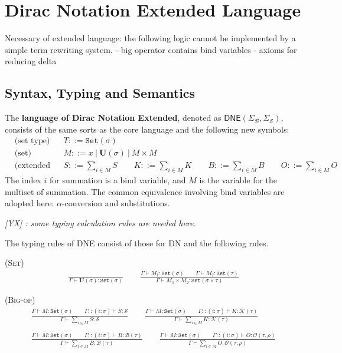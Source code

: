\documentclass[manuscript, review, timestamp]{acmart}
\newcommand{\yx}[1]{\textit{\color{blue}[YX] : #1}}
\newcommand*{\Sc}{\mathcal{S}}
\newcommand*{\K}{\mathcal{K}}
\newcommand*{\B}{\mathcal{B}}
\newcommand*{\Op}{\mathcal{O}}
\begin{document}

\section{Dirac Notation Extended Language}

Necessary of extended language: the following logic cannot be implemented by a simple term rewriting system.
- big operator contains bind variables
- axioms for reducing delta

\subsection{Syntax, Typing and Semantics}
\begin{definition}[DNE]
    The \textbf{language of Dirac Notation Extended}, denoted as $\textsf{DNE}(\Sigma_\mathcal{B}, \Sigma_\mathcal{S})$, consists of the same sorts as the core language and the following new symbols:
    \begin{align*}
        & \text{(set type)} && T ::= \texttt{Set}(\sigma) \\
        & \text{(set)} && M ::= x\ |\ \mathbf{U}(\sigma)\ |\ M \times M \\
        & \text{(extended Dirac notation)} && S ::= \sum_{i \in M} S
        \qquad K ::= \sum_{i \in M} K
        \qquad B ::= \sum_{i \in M} B
        \qquad O ::= \sum_{i \in M} O
    \end{align*}
    The index $i$ for summation is a bind variable, and $M$ is the variable for the multiset of summation. The common equivalence involving bind variables are adopted here: $\alpha$-conversion and substitutions.
\end{definition}


\yx{some typing calculation rules are needed here.}

The typing rules of DNE consist of those for DN and the following rules.

\textsc{(Set)}
\begin{gather*}
  \frac{}{\Gamma \vdash \mathbf{U}(\sigma) : \texttt{Set}(\sigma)}
  \qquad
  \frac{\Gamma \vdash M_1 : \texttt{Set}(\sigma) \qquad \Gamma \vdash M_2 : \texttt{Set}(\tau)}{\Gamma \vdash M_1 \times M_2 : \texttt{Set}(\sigma \times \tau)}
\end{gather*}

\textsc{(Big-op)}
\begin{gather*}
  \frac{\Gamma \vdash M : \texttt{Set}(\sigma) \qquad \Gamma::(i : \sigma) \vdash S : \Sc}{\Gamma \vdash \sum_{i \in M} S : \Sc}
  \qquad
  \frac{\Gamma \vdash M : \texttt{Set}(\sigma) \qquad \Gamma::(i : \sigma) \vdash K : \K(\tau)}{\Gamma \vdash \sum_{i \in M} K : \K(\tau)} \\
  \\
  \frac{\Gamma \vdash M : \texttt{Set}(\sigma) \qquad \Gamma::(i : \sigma) \vdash B : \B(\tau)}{\Gamma \vdash \sum_{i \in M} B : \B(\tau)}
  \qquad
  \frac{\Gamma \vdash M : \texttt{Set}(\sigma) \qquad \Gamma::(i : \sigma) \vdash O : \Op(\tau, \rho)}{\Gamma \vdash \sum_{i \in M} O : \Op(\tau, \rho)}
\end{gather*}
\end{document}
